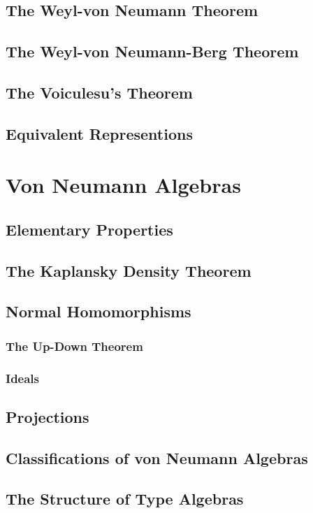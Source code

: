 \documentclass[a4paper, 11pt]{report}
\begin{document}
	\section{The Weyl-von Neumann Theorem}
	\section{The Weyl-von Neumann-Berg Theorem}
	\section{The Voiculesu's Theorem}
	\section{Equivalent Representions}


	\chapter{Von Neumann Algebras}

	\section{Elementary Properties}
	\section{The Kaplansky Density Theorem}
	\section{Normal Homomorphisms}
	\subsection{The Up-Down Theorem}
	\subsection{Ideals}
	\section{Projections}
	\section{Classifications of von Neumann Algebras}
	\section{The Structure of Type \uppercase\expandafter{} Algebras}
\end{document}

